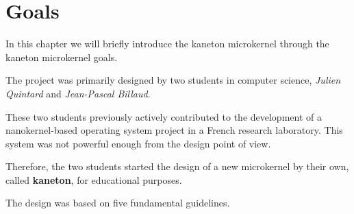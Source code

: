 %
%
%
%
%
%

%
%

\chapter{Goals}
\label{chapter:goals}

In this chapter we will briefly introduce the kaneton microkernel
through the kaneton microkernel goals.

\newpage

%
%

The project was primarily designed by two students in computer science,
\textit{Julien Quintard} and \textit{Jean-Pascal Billaud}.

These two students previously actively contributed to the development
of a nanokernel-based operating system project in a French research laboratory.
This system was not powerful enough from the design point of view.

Therefore, the two students started the design of a new microkernel
by their own, called \textbf{kaneton}, for educational purposes.

The design was based on five fundamental guidelines.

